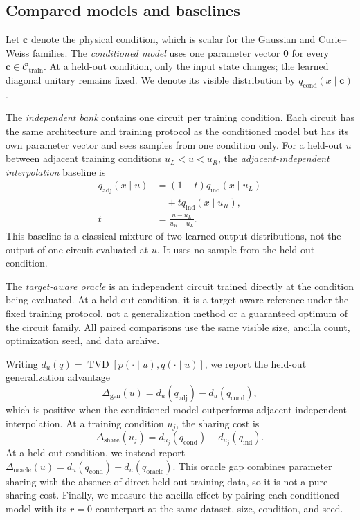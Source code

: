 \documentclass[pra,aps,10pt,twocolumn,floatfix,superscriptaddress,
notitlepage,longbibliography]{revtex4-2}
\newcommand{\TVD}{\operatorname{TVD}}
\begin{document}
\subsection{Compared models and baselines}

Let $\boldsymbol c$ denote the physical condition, which is scalar for the Gaussian and Curie--Weiss families. The \emph{conditioned model} uses one parameter vector $\boldsymbol\theta$ for every $\boldsymbol c\in\mathcal C_{\mathrm{train}}$. At a held-out condition, only the input state changes; the learned diagonal unitary remains fixed. We denote its visible distribution by $q_{\mathrm{cond}}(x\mid\boldsymbol c)$.

The \emph{independent bank} contains one circuit per training condition. Each circuit has the same architecture and training protocol as the conditioned model but has its own parameter vector and sees samples from one condition only. For a held-out $u$ between adjacent training conditions $u_L<u<u_R$, the \emph{adjacent-independent interpolation} baseline is
\begin{equation}
\begin{aligned}
    q_{\mathrm{adj}}(x\mid u)
    &=(1-t)q_{\mathrm{ind}}(x\mid u_L)\\
    &\quad+tq_{\mathrm{ind}}(x\mid u_R),\\
    t&=\frac{u-u_L}{u_R-u_L}.
\end{aligned}
    \label{eq:adjacent-independent-interpolation}
\end{equation}
This baseline is a classical mixture of two learned output distributions, not the output of one circuit evaluated at $u$. It uses no sample from the held-out condition.

The \emph{target-aware oracle} is an independent circuit trained directly at the condition being evaluated. At a held-out condition, it is a target-aware reference under the fixed training protocol, not a generalization method or a guaranteed optimum of the circuit family. All paired comparisons use the same visible size, ancilla count, optimization seed, and data archive.

Writing $d_u(q)=\TVD[p(\cdot\mid u),q(\cdot\mid u)]$, we report the held-out generalization advantage
\begin{equation}
    \Delta_{\mathrm{gen}}(u)
    =d_u(q_{\mathrm{adj}})-d_u(q_{\mathrm{cond}}),
    \label{eq:generalization-advantage}
\end{equation}
which is positive when the conditioned model outperforms adjacent-independent interpolation. At a training condition $u_j$, the sharing cost is
\begin{equation}
    \Delta_{\mathrm{share}}(u_j)
    =d_{u_j}(q_{\mathrm{cond}})-d_{u_j}(q_{\mathrm{ind}}).
    \label{eq:sharing-cost}
\end{equation}
At a held-out condition, we instead report $\Delta_{\mathrm{oracle}}(u)=d_u(q_{\mathrm{cond}})-d_u(q_{\mathrm{oracle}})$. This oracle gap combines parameter sharing with the absence of direct held-out training data, so it is not a pure sharing cost. Finally, we measure the ancilla effect by pairing each conditioned model with its $r=0$ counterpart at the same dataset, size, condition, and seed.
\end{document}
